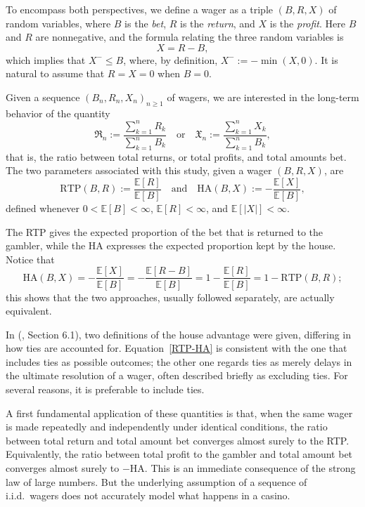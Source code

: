 \documentclass{article}
\theoremstyle{definition}
\theoremstyle{remark}
\newcommand{\E}{\mathbb{E}}
\newcommand{\RTP}{\mathrm{RTP}}
\newcommand{\HA}{\mathrm{HA}}
\begin{document}
To encompass both perspectives, we define a wager as a triple $(B, R, X)$ of random variables, where $B$ is the \textit{bet}, $R$ is the \textit{return}, and $X$ is the \textit{profit}.  Here $B$ and $R$ are nonnegative, and the formula relating the three random variables is
\[
    X = R - B,
\]
which implies that $X^- \le B$, where, by definition, $X^- := -\min(X,0)$. It is natural to assume that $R=X=0$ when $B=0$.


Given a sequence $(B_n, R_n, X_n)_{n\ge 1}$ of wagers, we are interested in the long-term behavior of the quantity
\[
 \mathfrak{R}_n := \frac{\sum_{k=1}^n R_k}{\sum_{k=1}^n B_k}
 \quad\text{or}\quad
 \mathfrak{X}_n := \frac{\sum_{k=1}^n X_k}{\sum_{k=1}^n B_k},
\]
that is, the ratio between total returns, or total profits, and total amounts bet.  
The two parameters associated with this study, given a wager $(B, R, X)$, are
\begin{equation}\label{RTP-HA}
    \RTP(B,R) := \frac{\E[R]}{\E[B]}
    \quad\text{and}\quad
    \HA(B,X) := -\frac{\E[X]}{\E[B]},
\end{equation}
defined whenever $0 < \E[B] < \infty$, $\E[R] < \infty$, and $\E[|X|] < \infty$.

The RTP gives the expected proportion of the bet that is returned to the gambler, while the HA expresses the expected proportion kept by the house.   Notice that
\begin{equation*}
\HA(B,X) = -\frac{\E[X]}{\E[B]}
= -\frac{\E[R - B]}{\E[B]}
= 1 - \frac{\E[R]}{\E[B]}
= 1 - \RTP(B,R);
\end{equation*}
this shows that the two approaches, usually followed separately, are actually equivalent.

In \citeauthor{E10} (\citeyear{E10}, Section 6.1), two definitions of the house advantage were given, differing in how ties are accounted for.  Equation~\eqref{RTP-HA} is consistent with the one that includes ties as possible outcomes; the other one regards ties as merely delays in the ultimate resolution of a wager, often described briefly as excluding ties.  For several reasons, it is preferable to include ties.

A first fundamental application of these quantities is that, when the same wager is made repeatedly and independently under identical  conditions, the ratio between total return and total amount bet converges almost surely to the RTP.  Equivalently, the ratio between total profit to the gambler and total amount bet converges almost surely to $-\HA$.  This is an immediate consequence of the strong law of large numbers.  But the underlying assumption of a sequence of i.i.d.\ wagers does not accurately model what happens in a casino.
\end{document}
